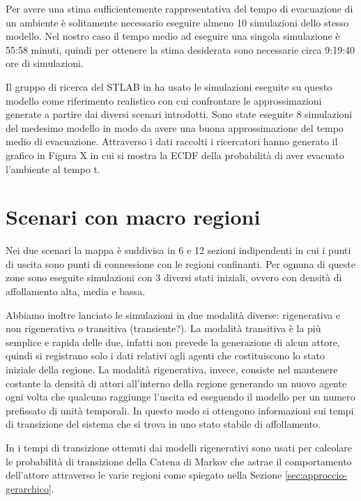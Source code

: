 Per avere una stima sufficientemente rappresentativa del tempo di evacuazione di un ambiente è solitamente necessario eseguire almeno 10 simulazioni dello stesso modello. Nel nostro caso il tempo medio ad eseguire una singola simulazione è 55:58 minuti, quindi per ottenere la stima desiderata sono necessarie circa 9:19:40 ore di simulazioni.

Il gruppo di ricerca del STLAB in \cite{esperimenti-sandro} ha usato le simulazioni eseguite su questo modello come riferimento realistico con cui confrontare le approssimazioni generate a partire dai diversi scenari introdotti. Sono state eseguite 8 simulazioni del medesimo modello in modo da avere una buona approssimazione del tempo medio di evacuazione. Attraverso i dati raccolti i ricercatori hanno generato il grafico in Figura X in cui si mostra la ECDF della probabilità di aver evacuato l'ambiente al tempo t.

\section{Scenari con macro regioni}

Nei due scenari la mappa è suddivisa in 6 e 12 sezioni indipendenti in cui i punti di uscita sono punti di connessione con le regioni confinanti. Per ognuna di queste zone sono eseguite simulazioni con 3 diversi stati iniziali, ovvero con densità di affollamento alta, media e bassa. 

Abbiamo inoltre lanciato le simulazioni in due modalità diverse: rigenerativa e non rigenerativa o transitiva (transiente?). La modalità transitiva è la più semplice e rapida delle due, infatti non prevede la generazione di alcun attore, quindi si registrano solo i dati relativi agli agenti che costituiscono lo stato iniziale della regione. La modalità rigenerativa, invece, consiste nel mantenere costante la densità di attori all'interno della regione generando un nuovo agente ogni volta che qualcuno raggiunge l'uscita ed eseguendo il modello per un numero prefissato di unità temporali. In questo modo si ottengono informazioni sui tempi di transizione del sistema che si trova in uno stato stabile di affollamento.

In \cite{esperimenti-sandro} i tempi di transizione ottenuti dai modelli rigenerativi sono usati per calcolare le probabilità di transizione della Catena di Markov che astrae il comportamento dell'attore attraverso le varie regioni come spiegato nella Sezione \ref{sec:approccio-gerarchico}.



